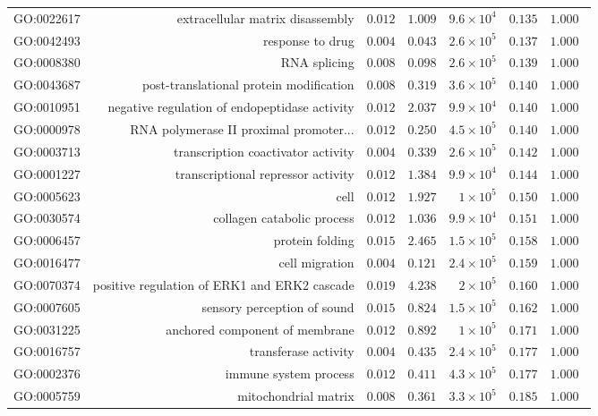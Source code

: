 \documentclass{article}
\begin{document}
\begin{longtable}{|l|r|r|r|r|r|r|}
GO:0022617 & extracellular matrix disassembly & $ 0.012$ & $ 1.009$ & $9.6\times 10^{4}$ & $ 0.135$ & $ 1.000~~$ \\
GO:0042493 & response to drug & $ 0.004$ & $ 0.043$ & $2.6\times 10^{5}$ & $ 0.137$ & $ 1.000~~$ \\
GO:0008380 & RNA splicing & $ 0.008$ & $ 0.098$ & $2.6\times 10^{5}$ & $ 0.139$ & $ 1.000~~$ \\
GO:0043687 & post-translational protein modification & $ 0.008$ & $ 0.319$ & $3.6\times 10^{5}$ & $ 0.140$ & $ 1.000~~$ \\
GO:0010951 & negative regulation of endopeptidase activity & $ 0.012$ & $ 2.037$ & $9.9\times 10^{4}$ & $ 0.140$ & $ 1.000~~$ \\
GO:0000978 & RNA polymerase II proximal promoter... & $ 0.012$ & $ 0.250$ & $4.5\times 10^{5}$ & $ 0.140$ & $ 1.000~~$ \\
GO:0003713 & transcription coactivator activity & $ 0.004$ & $ 0.339$ & $2.6\times 10^{5}$ & $ 0.142$ & $ 1.000~~$ \\
GO:0001227 & transcriptional repressor activity & $ 0.012$ & $ 1.384$ & $9.9\times 10^{4}$ & $ 0.144$ & $ 1.000~~$ \\
GO:0005623 & cell & $ 0.012$ & $ 1.927$ & $ 1\times 10^{5}$ & $ 0.150$ & $ 1.000~~$ \\
GO:0030574 & collagen catabolic process & $ 0.012$ & $ 1.036$ & $9.9\times 10^{4}$ & $ 0.151$ & $ 1.000~~$ \\
GO:0006457 & protein folding & $ 0.015$ & $ 2.465$ & $1.5\times 10^{5}$ & $ 0.158$ & $ 1.000~~$ \\
GO:0016477 & cell migration & $ 0.004$ & $ 0.121$ & $2.4\times 10^{5}$ & $ 0.159$ & $ 1.000~~$ \\
GO:0070374 & positive regulation of ERK1 and ERK2 cascade & $ 0.019$ & $ 4.238$ & $ 2\times 10^{5}$ & $ 0.160$ & $ 1.000~~$ \\
GO:0007605 & sensory perception of sound & $ 0.015$ & $ 0.824$ & $1.5\times 10^{5}$ & $ 0.162$ & $ 1.000~~$ \\
GO:0031225 & anchored component of membrane & $ 0.012$ & $ 0.892$ & $ 1\times 10^{5}$ & $ 0.171$ & $ 1.000~~$ \\
GO:0016757 & transferase activity & $ 0.004$ & $ 0.435$ & $2.4\times 10^{5}$ & $ 0.177$ & $ 1.000~~$ \\
GO:0002376 & immune system process & $ 0.012$ & $ 0.411$ & $4.3\times 10^{5}$ & $ 0.177$ & $ 1.000~~$ \\
GO:0005759 & mitochondrial matrix & $ 0.008$ & $ 0.361$ & $3.3\times 10^{5}$ & $ 0.185$ & $ 1.000~~$ \\

\end{longtable}
\end{document}
